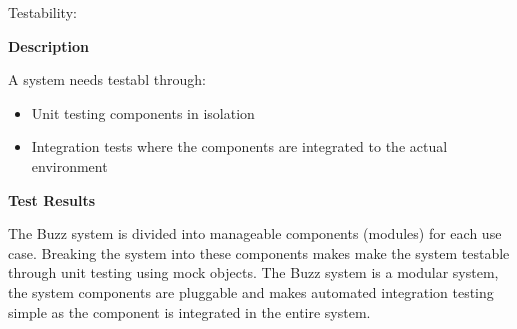 \newpage
\item Testability:

\textbf{Description}

A system needs testabl through:
\begin{itemize}
\item Unit testing components in isolation
\item Integration tests where the components are integrated to the actual environment
\end{itemize}

\textbf{Test Results}
   
The Buzz system is divided into manageable components (modules) for each use case. Breaking the system into these components makes make the system testable through unit testing using mock objects. The Buzz system is a modular system, the system components are pluggable and makes automated integration testing simple as the component is integrated in the entire system.    